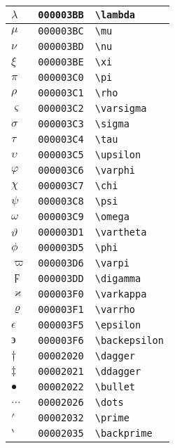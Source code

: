 \begin{longtable}{|l|l|l|}
$\lambda$ & \texttt{000003BB} & \verb|\lambda| \\
\hline
$\mu$ & \texttt{000003BC} & \verb|\mu| \\
\hline
$\nu$ & \texttt{000003BD} & \verb|\nu| \\
\hline
$\xi$ & \texttt{000003BE} & \verb|\xi| \\
\hline
$\pi$ & \texttt{000003C0} & \verb|\pi| \\
\hline
$\rho$ & \texttt{000003C1} & \verb|\rho| \\
\hline
$\varsigma$ & \texttt{000003C2} & \verb|\varsigma| \\
\hline
$\sigma$ & \texttt{000003C3} & \verb|\sigma| \\
\hline
$\tau$ & \texttt{000003C4} & \verb|\tau| \\
\hline
$\upsilon$ & \texttt{000003C5} & \verb|\upsilon| \\
\hline
$\varphi$ & \texttt{000003C6} & \verb|\varphi| \\
\hline
$\chi$ & \texttt{000003C7} & \verb|\chi| \\
\hline
$\psi$ & \texttt{000003C8} & \verb|\psi| \\
\hline
$\omega$ & \texttt{000003C9} & \verb|\omega| \\
\hline
$\vartheta$ & \texttt{000003D1} & \verb|\vartheta| \\
\hline
$\phi$ & \texttt{000003D5} & \verb|\phi| \\
\hline
$\varpi$ & \texttt{000003D6} & \verb|\varpi| \\
\hline
$\digamma$ & \texttt{000003DD} & \verb|\digamma| \\
\hline
$\varkappa$ & \texttt{000003F0} & \verb|\varkappa| \\
\hline
$\varrho$ & \texttt{000003F1} & \verb|\varrho| \\
\hline
$\epsilon$ & \texttt{000003F5} & \verb|\epsilon| \\
\hline
$\backepsilon$ & \texttt{000003F6} & \verb|\backepsilon| \\
\hline
$\dagger$ & \texttt{00002020} & \verb|\dagger| \\
\hline
$\ddagger$ & \texttt{00002021} & \verb|\ddagger| \\
\hline
$\bullet$ & \texttt{00002022} & \verb|\bullet| \\
\hline
$\dots$ & \texttt{00002026} & \verb|\dots| \\
\hline
$\prime$ & \texttt{00002032} & \verb|\prime| \\
\hline
$\backprime$ & \texttt{00002035} & \verb|\backprime| \\

\end{longtable}
